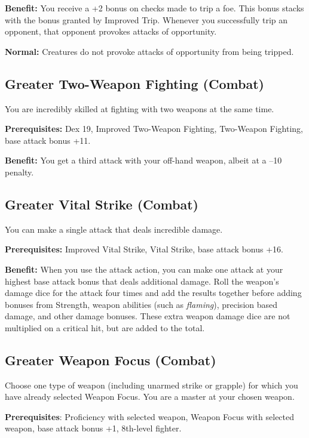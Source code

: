 \textbf{Benefit:} You receive a +2 bonus on checks made to trip a foe. This bonus stacks with the bonus granted by Improved Trip. Whenever you successfully trip an opponent, that opponent provokes attacks of opportunity.
				
\textbf{Normal:} Creatures do not provoke attacks of opportunity from being tripped.
				
\subsection{Greater Two-Weapon Fighting (Combat)}

				
You are incredibly skilled at fighting with two weapons at the same time.
				
\textbf{Prerequisites:} Dex 19, Improved Two-Weapon Fighting, Two-Weapon Fighting, base attack bonus +11.
				
\textbf{Benefit:} You get a third attack with your off-hand weapon, albeit at a --10 penalty.
				
\subsection{Greater Vital Strike (Combat)}

				
You can make a single attack that deals incredible damage.
				
\textbf{Prerequisites:} Improved Vital Strike, Vital Strike, base attack bonus +16.
				
\textbf{Benefit:} When you use the attack action, you can make one attack at your highest base attack bonus that deals additional damage. Roll the weapon's damage dice for the attack four times and add the results together before adding bonuses from Strength, weapon abilities (such as \textit{flaming}), precision based damage, and other damage bonuses. These extra weapon damage dice are not multiplied on a critical hit, but are added to the total.
				
\subsection{Greater Weapon Focus (Combat)}

				
Choose one type of weapon (including unarmed strike or grapple) for which you have already selected Weapon Focus. You are a master at your chosen weapon.

\textbf{ Prerequisites}: Proficiency with selected weapon, Weapon Focus with selected weapon, base attack bonus +1, 8th-level fighter.
				
